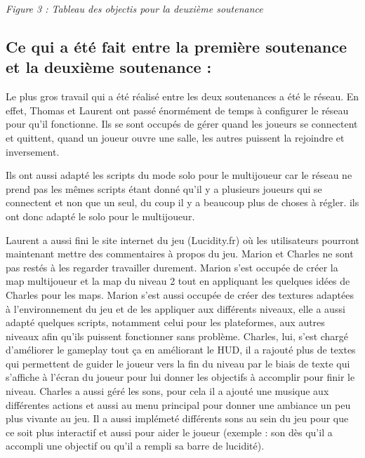 \documentclass{article}
\begin{document}
\quad

\quad

\begin{centering}

\textit{Figure 3 : Tableau des objectis pour la deuxième soutenance}

\end {centering}


	\subsection{Ce qui a été fait entre la première soutenance et la deuxième soutenance :}


\quad

\quad

Le plus gros travail qui a été réalisé entre les deux soutenances a été le réseau. En effet, Thomas et Laurent ont passé énormément de temps à configurer le réseau pour qu’il fonctionne. Ils se sont occupés de gérer quand les joueurs se connectent et quittent, quand un joueur ouvre une salle, les autres puissent la rejoindre et inversement.

Ils ont aussi adapté les scripts du mode solo pour le multijoueur car le réseau ne prend pas les mêmes scripts étant donné qu’il y a plusieurs joueurs qui se connectent et non que un seul, du coup il y a beaucoup plus de choses à régler. ils ont donc adapté le solo pour le multijoueur.


Laurent a aussi fini le site internet du jeu (Lucidity.fr) où les utilisateurs pourront maintenant mettre des commentaires à propos du jeu.
Marion et Charles ne sont pas restés à les regarder travailler durement. Marion s’est occupée de créer la map multijoueur et la map du niveau 2 tout en appliquant les quelques idées de Charles pour les maps. Marion s’est aussi occupée de créer des textures adaptées à l’environnement du jeu et de les appliquer aux différents niveaux, elle a aussi adapté quelques scripts, notamment celui pour les plateformes, aux autres niveaux afin qu’ils puissent fonctionner sans problème. 
Charles, lui, s’est chargé d’améliorer le gameplay tout ça en améliorant le HUD, il a rajouté plus de textes qui permettent de guider le joueur vers la fin du niveau par le biais de texte qui s’affiche à l’écran du joueur pour lui donner les objectifs à accomplir pour finir le niveau. Charles a aussi géré les sons, pour cela il a ajouté une musique aux différentes actions et aussi au menu principal pour donner une ambiance un peu plus vivante au jeu. Il a aussi implémeté différents sons au sein du jeu pour que ce soit plus interactif et aussi pour aider le joueur (exemple : son dès qu’il a accompli une objectif ou qu’il a rempli sa barre de lucidité).
\end{document}

